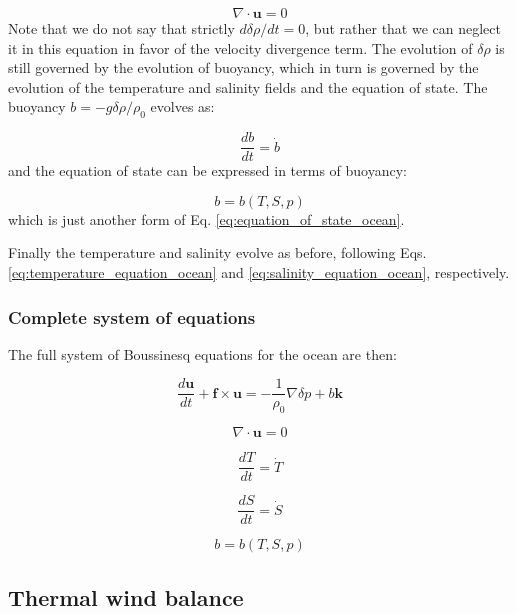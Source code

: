 \documentclass[12pt]{article}
\numberwithin{equation}{section}
\numberwithin{figure}{section}
\numberwithin{table}{section}
\begin{document}
\begin{equation}
  \nabla \cdot \mathbf{u} = 0
\end{equation}
Note that we do not say that strictly $d \delta \rho / dt = 0$, but rather that
we can neglect it in this equation in favor of the velocity divergence term.
The evolution of $\delta \rho$ is still governed by the evolution of buoyancy,
which in turn is governed by the evolution of the temperature and salinity fields
and the equation of state.
The buoyancy $b = - g \delta \rho / \rho_0$ evolves as:

\begin{equation}
  \frac{d b}{dt} = \dot{b}
\end{equation}
and the equation of state can be expressed in terms of buoyancy:

\begin{equation}
  b = b(T, S, p)
\end{equation}
which is just another form of Eq. \ref{eq:equation_of_state_ocean}.

Finally the temperature and salinity evolve as before, following
Eqs. \ref{eq:temperature_equation_ocean} and \ref{eq:salinity_equation_ocean},
respectively.

\subsubsection{Complete system of equations}

The full system of Boussinesq equations for the ocean are then:

\begin{equation}
  \frac{d \mathbf{u}}{dt} + \mathbf{f} \times \mathbf{u} =
  - \frac{1}{\rho_0} \nabla \delta p + b \mathbf{k}
\end{equation}

\begin{equation}
  \nabla \cdot \mathbf{u} = 0
\end{equation}

\begin{equation}
  \frac{d T}{dt} = \dot{T}
\end{equation}

\begin{equation}
  \frac{d S}{dt} = \dot{S}
\end{equation}

\begin{equation}
  b = b(T, S, p)
\end{equation}

\subsection{Thermal wind balance}
\end{document}
